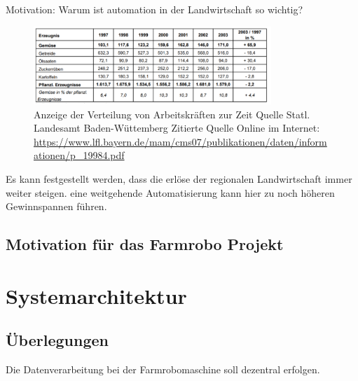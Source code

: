 \documentclass[]{article}
\begin{document}
Motivation:
Warum ist automation in der Landwirtschaft so wichtig?

	\begin{figure}[H]
	\centering
	\includegraphics[width=0.8\textwidth]{Tabelle_Daten_Produktion.PNG}
	\caption{Anzeige der Verteilung von Arbeitskräften zur Zeit \newline
		Quelle Statl. Landesamt Baden-Wüttemberg Zitierte Quelle Online im Internet:
		\url{ https://www.lfl.bayern.de/mam/cms07/publikationen/daten/informationen/p_19984.pdf}}
	\label{img:grafik-dummy}
	
\end{figure} 

Es kann festgestellt werden, dass die erlöse der regionalen Landwirtschaft immer weiter steigen. eine weitgehende Automatisierung kann hier zu noch höheren Gewinnspannen führen.

\subsection{Motivation für das Farmrobo Projekt}


\section{Systemarchitektur}

\subsection{Überlegungen}
Die Datenverarbeitung bei der Farmrobomaschine soll dezentral erfolgen.
\end{document}
